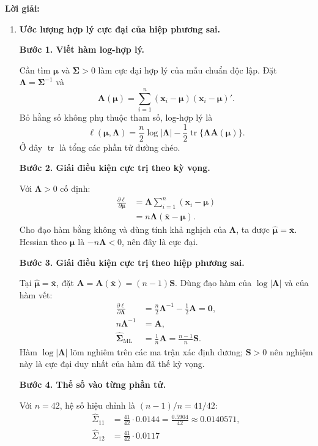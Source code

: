 \documentclass[11pt,a4paper]{article}
\renewcommand{\boldsymbol}[1]{\symbf{#1}}
\newenvironment{solution}{%
  \par\medskip\noindent\textbf{Lời giải:}\par\nobreak\smallskip\noindent\ignorespaces
}{\par}
\newcommand{\step}[2]{\par\medskip\noindent\textbf{Bước #1. #2}\par\nopagebreak[4]\smallskip\noindent}
\begin{document}
\begin{solution}
\begin{enumerate}[label=\textbf{\alph*)}]
\item \textbf{Ước lượng hợp lý cực đại của hiệp phương sai.}\par\nopagebreak[4]
\step{1}{Viết hàm log-hợp lý.}
Cần tìm $\boldsymbol{\mu}$ và $\boldsymbol{\Sigma}>0$ làm cực đại hợp lý
của mẫu chuẩn độc lập. Đặt $\boldsymbol{\Lambda}=\boldsymbol{\Sigma}^{-1}$
và
\[
\mathbf{A}(\boldsymbol{\mu})=
\sum_{i=1}^n(\mathbf{x}_i-\boldsymbol{\mu})(\mathbf{x}_i-\boldsymbol{\mu})'.
\]
Bỏ hằng số không phụ thuộc tham số, log-hợp lý là
\[
\ell(\boldsymbol{\mu},\boldsymbol{\Lambda})
=\frac n2\log|\boldsymbol{\Lambda}|
-\frac12\operatorname{tr}\{\boldsymbol{\Lambda}\mathbf{A}(\boldsymbol{\mu})\}.
\]
Ở đây $\operatorname{tr}$ là tổng các phần tử đường chéo.
\step{2}{Giải điều kiện cực trị theo kỳ vọng.}
Với $\boldsymbol{\Lambda}>0$ cố định:
\begin{align*}
\frac{\partial\ell}{\partial\boldsymbol{\mu}}
&=\boldsymbol{\Lambda}\sum_{i=1}^n(\mathbf{x}_i-\boldsymbol{\mu})\\
&=n\boldsymbol{\Lambda}(\bar{\mathbf{x}}-\boldsymbol{\mu}).
\end{align*}
Cho đạo hàm bằng không và dùng tính khả nghịch của $\boldsymbol{\Lambda}$,
ta được $\widehat{\boldsymbol{\mu}}=\bar{\mathbf{x}}$.
Hessian theo $\boldsymbol{\mu}$ là $-n\boldsymbol{\Lambda}<0$, nên đây là cực đại.
\step{3}{Giải điều kiện cực trị theo hiệp phương sai.}
Tại $\widehat{\boldsymbol{\mu}}=\bar{\mathbf{x}}$, đặt
$\mathbf{A}=\mathbf{A}(\bar{\mathbf{x}})=(n-1)\mathbf{S}$.
Dùng đạo hàm của $\log|\boldsymbol{\Lambda}|$ và của hàm vết:
\begin{align*}
\frac{\partial\ell}{\partial\boldsymbol{\Lambda}}
&=\frac n2\boldsymbol{\Lambda}^{-1}-\frac12\mathbf{A}=\mathbf{0},\\
n\boldsymbol{\Lambda}^{-1}&=\mathbf{A},\\
\widehat{\boldsymbol{\Sigma}}_{\mathrm{ML}}
&=\frac1n\mathbf{A}=\frac{n-1}{n}\mathbf{S}.
\end{align*}
Hàm $\log|\boldsymbol{\Lambda}|$ lõm nghiêm trên các ma trận xác định dương;
$\mathbf{S}>0$ nên nghiệm này là cực đại duy nhất của hàm đã thế kỳ vọng.
\step{4}{Thế số vào từng phần tử.}
Với $n=42$, hệ số hiệu chỉnh là $(n-1)/n=41/42$:
\begin{align*}
\widehat{\Sigma}_{11}&=\frac{41}{42}\cdot0.0144
=\frac{0.5904}{42}\approx0.0140571,\\
\widehat{\Sigma}_{12}&=\frac{41}{42}\cdot0.0117

\end{align*}
\end{enumerate}
\end{solution}
\end{document}
